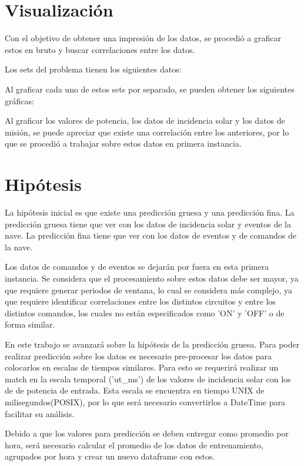 \documentclass[../Main.tex]{subfiles}
\begin{document}
\section{Visualización}
Con el objetivo de obtener una impresión de los datos, se procedió a graficar estos en bruto y buscar correlaciones entre los datos. 

Los sets del problema tienen los siguientes datos:

Al graficar cada uno de estos sets por separado, se pueden obtener los siguientes gráficas:

Al graficar los valores de potencia, los datos de incidencia solar y los datos de misión, se puede apreciar que existe una correlación entre los anteriores, por lo que se procedió a trabajar sobre estos datos en primera instancia. 

\section{Hipótesis}
La hipótesis inicial es que existe una predicción gruesa y una predicción fina. La predicción gruesa tiene que ver con los datos de incidencia solar y eventos de la nave. La predicción fina tiene que ver con los datos de eventos y de comandos de la nave.

Los datos de comandos y de eventos se dejarán por fuera en esta primera instancia. Se considera que el procesamiento sobre estos datos debe ser mayor, ya que requiere generar periodos de ventana, lo cual se considera más complejo, ya que requiere identificar correlaciones entre los distintos circuitos y entre los distintos comandos, los cuales no están especificados como 'ON' y 'OFF' o de forma similar.

En este trabajo se avanzará sobre la hipótesis de la predicción gruesa. Para poder realizar predicción sobre los datos es necesario pre-procesar los datos para colocarlos en escalas de tiempos similares. Para esto se requerirá realizar un match en la escala temporal ('ut_ms') de los valores de incidencia solar con los de de potencia de entrada. Esta escala se encuentra en tiempo UNIX de milisegundos(POSIX), por lo que será necesario convertirlos a DateTime para facilitar su análisis.

Debido a que los valores para predicción se deben entregar como promedio por hora, será necesario calcular el promedio de los datos de entrenamiento, agrupados por hora y crear un nuevo dataframe con estos.
\end{document}
